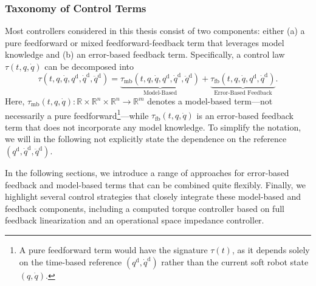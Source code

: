 \subsubsection{Taxonomy of Control Terms}
Most controllers considered in this thesis consist of two components: either (a) a pure feedforward or mixed feedforward-feedback term that leverages model knowledge and (b) an error-based feedback term. Specifically, a control law $\tau(t, q, \dot{q})$ can be decomposed into
\begin{equation}
    \tau(t, q, \dot{q}, q^\mathrm{d},\dot{q}^\mathrm{d},\ddot{q}^\mathrm{d}) = \underbrace{\tau_\mathrm{mb}(t, q, \dot{q}, q^\mathrm{d},\dot{q}^\mathrm{d},\ddot{q}^\mathrm{d})}_\text{Model-Based} + \underbrace{\tau_\mathrm{fb}(t, q, \dot{q}, q^\mathrm{d},\dot{q}^\mathrm{d})}_\text{Error-Based Feedback}.
\end{equation}
Here, $\tau_\mathrm{mb}(t, q, \dot{q}): \mathbb{R} \times \mathbb{R}^n \times \mathbb{R}^n \to \mathbb{R}^m$ denotes a model-based term—not necessarily a pure feedforward\footnote{A pure feedforward term would have the signature $\tau(t)$, as it depends solely on the time-based reference $(q^\mathrm{d},\dot{q}^\mathrm{d})$ rather than the current soft robot state $(q,\dot{q})$.}—while $\tau_\mathrm{fb}(t, q, \dot{q})$ is an error-based feedback term that does not incorporate any model knowledge. To simplify the notation, we will in the following not explicitly state the dependence on the reference $(q^\mathrm{d},\dot{q}^\mathrm{d},\ddot{q}^\mathrm{d})$.

In the following sections, we introduce a range of approaches for error-based feedback and model-based terms that can be combined quite flexibly. Finally, we highlight several control strategies that closely integrate these model-based and feedback components, including a computed torque controller based on full feedback linearization and an operational space impedance controller.

